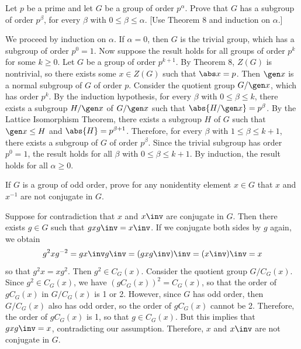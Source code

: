 \begin{exercise}
	Let $p$ be a prime and let $G$ be a group of order $p^\alpha$. Prove that $G$ has a subgroup of order $p^\beta$, for every $\beta$ with $0 \leq \beta \leq \alpha$. [Use Theorem 8 and induction on $\alpha$.]
\end{exercise}

\begin{sol}
	We proceed by induction on $\alpha$. If $\alpha = 0$, then $G$ is the trivial group, which has a subgroup of order $p^0 = 1$. Now suppose the result holds for all groups of order $p^k$ for some $k \geq 0$. Let $G$ be a group of order $p^{k + 1}$. By Theorem 8, $Z(G)$ is nontrivial, so there exists some $x \in Z(G)$ such that $\abs x = p$. Then $\gen x$ is a normal subgroup of $G$ of order $p$. Consider the quotient group $G/\gen x$, which has order $p^k$. By the induction hypothesis, for every $\beta$ with $0 \leq \beta \leq k$, there exists a subgroup $H/\gen x$ of $G/\gen x$ such that $\abs{H/\gen x} = p^\beta$. By the Lattice Isomorphism Theorem, there exists a subgroup $H$ of $G$ such that $\gen x \leq H$ and $\abs{H} = p^{\beta + 1}$. Therefore, for every $\beta$ with $1 \leq \beta \leq k + 1$, there exists a subgroup of $G$ of order $p^\beta$. Since the trivial subgroup has order $p^0 = 1$, the result holds for all $\beta$ with $0 \leq \beta \leq k + 1$. By induction, the result holds for all $\alpha \geq 0$.
\end{sol}

\begin{exercise}
	If $G$ is a group of odd order, prove for any nonidentity element $x \in G$ that $x$ and $x^{-1}$ are not conjugate in $G$.
\end{exercise}

\begin{sol}
	Suppose for contradiction that $x$ and $x\inv$ are conjugate in $G$. Then there exists $g \in G$ such that $gxg\inv = x\inv$. If we conjugate both sides by $g$ again, we obtain
	\[g^2xg^{-2} = gx\inv g\inv = (gxg\inv)\inv = (x\inv)\inv = x\]
	so that $g^2x = xg^2$. Then $g^2 \in C_G(x)$. Consider the quotient group $G/C_G(x)$. Since $g^2 \in C_G(x)$, we have $(gC_G(x))^2 = C_G(x)$, so that the order of $gC_G(x)$ in $G/C_G(x)$ is 1 or 2. However, since $G$ has odd order, then $G/C_G(x)$ also has odd order, so the order of $gC_G(x)$ cannot be 2. Therefore, the order of $gC_G(x)$ is 1, so that $g \in C_G(x)$. But this implies that $gxg\inv = x$, contradicting our assumption. Therefore, $x$ and $x\inv$ are not conjugate in $G$.
\end{sol}

